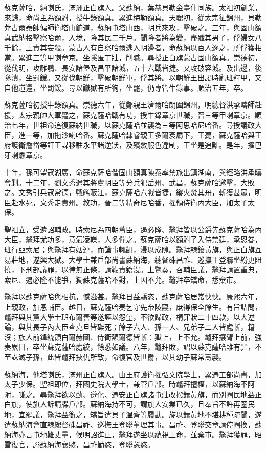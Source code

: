 \begin{pinyinscope}
蘇克薩哈，納喇氏，滿洲正白旗人。父蘇納，葉赫貝勒金臺什同族。太祖初創業，來歸，命尚主為額駙，授牛錄額真。累進梅勒額真。天聰初，從太宗征錦州，貝勒莽古爾泰帥偏師衛塔山餉道，蘇納屯塔山西，明兵來攻，擊破之。三年，與固山額真武納格擊察哈爾，入境，降其民二千戶。聞降者將為變，盡殲其男子，俘婦女八千餘，上責其妄殺。蒙古人有自察哈爾逃入明邊者，命蘇納以百人逐之，所俘獲相當。累進三等甲喇章京。坐隱匿丁壯，削職。尋授正白旗蒙古固山額真。崇德初，從伐明，攻雕鶚、長安諸堡及昌平諸城，五十六戰皆捷。又攻破容城。及出邊，後隊潰，坐罰鍰。又從伐朝鮮，擊破朝鮮軍，俘其將。以朝鮮王出謁時亂班釋甲，又自他道還，坐罰鍰。尋以讞獄有所徇，坐罷，仍專管牛錄事。順治五年，卒。

蘇克薩哈初授牛錄額真。崇德六年，從鄭親王濟爾哈朗圍錦州，明總督洪承疇師赴援，太宗親帥大軍蹙之，蘇克薩哈戰有功，授牛錄章京世職，晉三等甲喇章京。順治七年，世祖命追復蘇納世職，以蘇克薩哈並襲為三等阿思哈尼哈番。尋授議政大臣，進一等，加拖沙喇哈番。蘇克薩哈隸睿親王多爾袞屬下，王薨，蘇克薩哈與王府護衛詹岱等訐王謀移駐永平諸逆狀，及殯斂服色違制，王坐是追黜。是年，擢巴牙喇纛章京。

十年，孫可望寇湖廣，命蘇克薩哈偕固山額真陳泰率禁旅出鎮湖南，與經略洪承疇會剿。十二年，劉文秀遣其將盧明臣等分兵犯岳州、武昌，蘇克薩哈邀擊，大敗之。文秀引兵寇常德，戰艦蔽江，蘇克薩哈六戰皆捷，縱火焚其舟，斬獲甚眾，明臣赴水死，文秀走貴州。敘功，晉二等精奇尼哈番，擢領侍衛內大臣，加太子太保。

聖祖立，受遺詔輔政。時索尼為四朝舊臣，遏必隆、鼇拜皆以公爵先蘇克薩哈為內大臣，鼇拜尤功多，意氣凌轢，人多憚之。蘇克薩哈以額駙子入侍禁廷，承恩眷，班行亞索尼；與鼇拜有姻連，而論事輒齟，浸以成隙。鼇拜隸鑲黃旗，與正白旗互易莊地，遂興大獄。大學士兼戶部尚書蘇納海，總督硃昌祚、巡撫王登聯坐紛更阻撓，下刑部議罪，以律無正條，請鞭責籍沒。上覽奏，召輔臣議，鼇拜請置重典，索尼、遏必隆不能爭，獨蘇克薩哈不對，上因不允。鼇拜卒矯命，悉棄市。

鼇拜以蘇克薩哈與相抗，憾滋甚。鼇拜日益驕恣，蘇克薩哈居常怏怏。康熙六年，上親政，加恩輔臣。越日，蘇克薩哈奏乞守先帝陵寢，庶得保全餘生。有旨詰問，鼇拜與其黨大學士班布爾善等遂誣以怨望，不欲歸政，構罪狀二十四款，以大逆論，與其長子內大臣查克旦皆磔死；餘子六人、孫一人、兄弟子二人皆處斬，籍沒；族人前鋒統領白爾赫圖、侍衛額爾德皆斬：獄上，上不允。鼇拜攘臂上前，強奏累日，卒坐蘇克薩哈處絞，餘悉如議。八年，鼇拜敗，詔以蘇克薩哈雖有罪，不至誅滅子孫，此皆鼇拜挾仇所致，命復官及世爵，以其幼子蘇常壽襲。

蘇納海，他塔喇氏，滿州正白旗人。由王府護衛擢弘文院學士，累遷工部尚書，加太子少保。聖祖即位，拜國史院大學士，兼管戶部。時鼇拜擅權，以蘇納海不阿附，嗛之。尋鼇拜欲以薊、遵化、遷安正白旗諸屯莊改撥鑲黃旗，而別圈民地益正白旗，使旗人訴請牒戶部。蘇納海持不可，謂旗人安業已久，且奉旨不許再圈民地，宜罷議，鼇拜益銜之，矯旨遣貝子溫齊等履勘。旋以鑲黃地不堪耕種疏聞，遂遣蘇納海會直隸總督硃昌祚、巡撫王登聯董理其事。昌祚、登聯交章請停圈換，蘇納海亦言屯地難丈量，候明詔進止，鼇拜遂坐以藐視上命，並棄市。鼇拜獲罪，昭雪復官，謚蘇納海襄愍，昌祚勤愍，登聯愨愍。


\end{pinyinscope}
